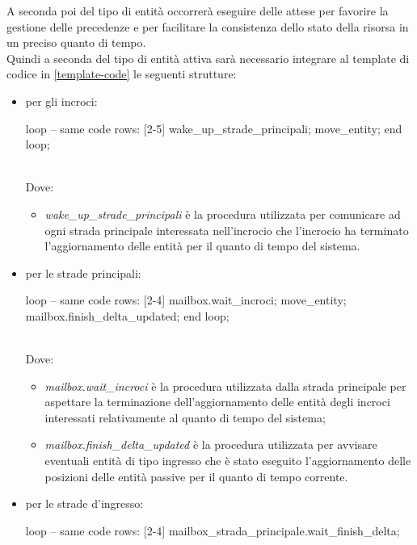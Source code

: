 A seconda poi del tipo di entità occorrerà eseguire delle attese per favorire
la gestione delle precedenze e per facilitare la consistenza dello stato della
risorsa in un preciso quanto di tempo. \\
Quindi a seconda del tipo di entità attiva sarà necessario integrare al
template di codice in \ref{template-code} le seguenti strutture:
\begin{itemize}
\item per gli incroci:\\
\begin{codiceada}[caption={Template-Code incroci}, label=template-code-incroci]
loop
	-- same code rows: [2-5]
	wake_up_strade_principali;
	move_entity;
end loop;
\end{codiceada}
\\
Dove:
\begin{itemize}
\item \textit{wake\_up\_strade\_principali} è la procedura utilizzata per
comunicare ad ogni strada principale interessata nell'incrocio che l'incrocio
ha terminato l'aggiornamento delle entità per il quanto di tempo del sistema.
\end{itemize}
\item per le strade principali:\\
\begin{codiceada}[caption={Template-Code strade principali}, label=template-code-principali]
loop
	-- same code rows: [2-4]
	mailbox.wait_incroci;	
	move_entity;
	mailbox.finish_delta_updated;
end loop;
\end{codiceada}
\\
Dove:
\begin{itemize}
\item \textit{mailbox.wait\_incroci} è la procedura utilizzata dalla strada
principale per aspettare la terminazione dell'aggiornamento delle entità degli
incroci interessati relativamente al quanto di tempo del sistema;
\item \textit{mailbox.finish\_delta\_updated} è la procedura utilizzata per avvisare eventuali entità di tipo ingresso che è stato eseguito l'aggiornamento delle posizioni delle entità passive per il quanto di tempo corrente.
\end{itemize}
\item per le strade d'ingresso:\\
\begin{codiceada}[caption={Template-Code strade ingresso}, label=template-code-ingresso]
loop
	-- same code rows: [2-4]
	mailbox_strada_principale.wait_finish_delta;	

\end{codiceada}
\end{itemize}
